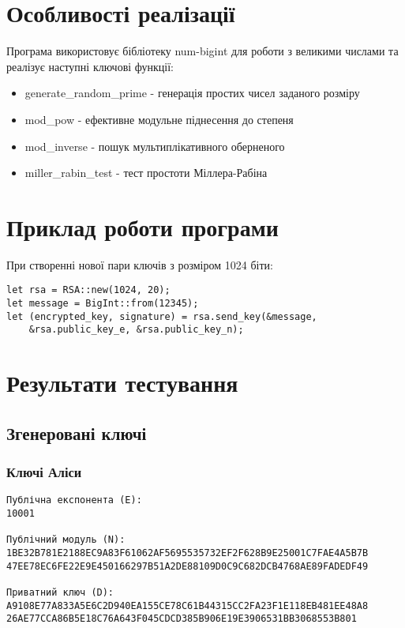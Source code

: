 \documentclass{article}
\begin{document}
\section{Особливості реалізації}
\quad 
Програма використовує бібліотеку num-bigint для роботи з великими числами та реалізує наступні ключові функції:
\begin{itemize}
    \item generate\_random\_prime - генерація простих чисел заданого розміру
    \item mod\_pow - ефективне модульне піднесення до степеня
    \item mod\_inverse - пошук мультиплікативного оберненого
    \item miller\_rabin\_test - тест простоти Міллера-Рабіна
\end{itemize}

\section{Приклад роботи програми}
\quad 
При створенні нової пари ключів з розміром 1024 біти:
\begin{verbatim}
let rsa = RSA::new(1024, 20);
let message = BigInt::from(12345);
let (encrypted_key, signature) = rsa.send_key(&message, 
    &rsa.public_key_e, &rsa.public_key_n);
\end{verbatim}

\section{Результати тестування}

\subsection{Згенеровані ключі}
\subsubsection{Ключі Аліси}
\begin{verbatim}
Публічна експонента (E):
10001

Публічний модуль (N):
1BE32B781E2188EC9A83F61062AF5695535732EF2F628B9E25001C7FAE4A5B7B
47EE78EC6FE22E9E450166297B51A2DE88109D0C9C682DCB4768AE89FADEDF49

Приватний ключ (D):
A9108E77A833A5E6C2D940EA155CE78C61B44315CC2FA23F1E118EB481EE48A8
26AE77CCA86B5E18C76A643F045CDCD385B906E19E3906531BB3068553B801
\end{verbatim}
\end{document}
